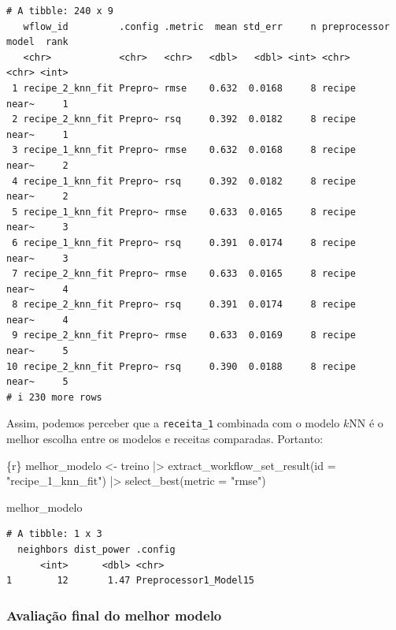 \documentclass[
  letterpaper,
  DIV=11,
  numbers=noendperiod,
  oneside]{scrartcl}
\newenvironment{Shaded}{\begin{snugshade}}{\end{snugshade}}
\newcommand{\AttributeTok}[1]{\textcolor[rgb]{0.40,0.45,0.13}{#1}}
\newcommand{\FunctionTok}[1]{\textcolor[rgb]{0.28,0.35,0.67}{#1}}
\newcommand{\InformationTok}[1]{\textcolor[rgb]{0.37,0.37,0.37}{#1}}
\newcommand{\NormalTok}[1]{\textcolor[rgb]{0.00,0.23,0.31}{#1}}
\newcommand{\OtherTok}[1]{\textcolor[rgb]{0.00,0.23,0.31}{#1}}
\newcommand{\SpecialCharTok}[1]{\textcolor[rgb]{0.37,0.37,0.37}{#1}}
\newcommand{\StringTok}[1]{\textcolor[rgb]{0.13,0.47,0.30}{#1}}
\begin{document}
\begin{verbatim}
# A tibble: 240 x 9
   wflow_id         .config .metric  mean std_err     n preprocessor model  rank
   <chr>            <chr>   <chr>   <dbl>   <dbl> <int> <chr>        <chr> <int>
 1 recipe_2_knn_fit Prepro~ rmse    0.632  0.0168     8 recipe       near~     1
 2 recipe_2_knn_fit Prepro~ rsq     0.392  0.0182     8 recipe       near~     1
 3 recipe_1_knn_fit Prepro~ rmse    0.632  0.0168     8 recipe       near~     2
 4 recipe_1_knn_fit Prepro~ rsq     0.392  0.0182     8 recipe       near~     2
 5 recipe_1_knn_fit Prepro~ rmse    0.633  0.0165     8 recipe       near~     3
 6 recipe_1_knn_fit Prepro~ rsq     0.391  0.0174     8 recipe       near~     3
 7 recipe_2_knn_fit Prepro~ rmse    0.633  0.0165     8 recipe       near~     4
 8 recipe_2_knn_fit Prepro~ rsq     0.391  0.0174     8 recipe       near~     4
 9 recipe_2_knn_fit Prepro~ rmse    0.633  0.0169     8 recipe       near~     5
10 recipe_2_knn_fit Prepro~ rsq     0.390  0.0188     8 recipe       near~     5
# i 230 more rows
\end{verbatim}

Assim, podemos perceber que a \texttt{receita\_1} combinada com o modelo
\(k\)NN é o melhor escolha entre os modelos e receitas comparadas.
Portanto:

\begin{Shaded}
\begin{Highlighting}[]
\InformationTok{\textasciigrave{}\textasciigrave{}\textasciigrave{}\{r\}}
\NormalTok{melhor\_modelo }\OtherTok{\textless{}{-}} 
\NormalTok{  treino }\SpecialCharTok{|\textgreater{}} 
  \FunctionTok{extract\_workflow\_set\_result}\NormalTok{(}\AttributeTok{id =} \StringTok{"recipe\_1\_knn\_fit"}\NormalTok{) }\SpecialCharTok{|\textgreater{}} 
  \FunctionTok{select\_best}\NormalTok{(}\AttributeTok{metric =} \StringTok{"rmse"}\NormalTok{)}

\NormalTok{melhor\_modelo}
\InformationTok{\textasciigrave{}\textasciigrave{}\textasciigrave{}}
\end{Highlighting}
\end{Shaded}

\begin{verbatim}
# A tibble: 1 x 3
  neighbors dist_power .config              
      <int>      <dbl> <chr>                
1        12       1.47 Preprocessor1_Model15
\end{verbatim}

\hypertarget{avaliauxe7uxe3o-final-do-melhor-modelo}{%
\subsubsection{Avaliação final do melhor
modelo}\label{avaliauxe7uxe3o-final-do-melhor-modelo}}
\end{document}
